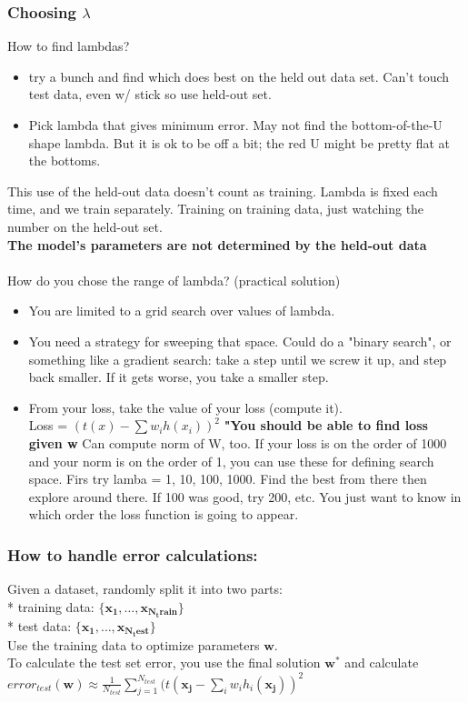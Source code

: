 \subsubsection{Choosing $\lambda$}
How to find lambdas? 
\begin{itemize}
	\item try a bunch and find which does best on the held out data set.  
		Can't touch test data, even w/ stick so use held-out set. 
	\item Pick lambda that gives minimum error.
		May not find the bottom-of-the-U shape lambda.  
		But it is ok to be off a bit; the red U might be pretty flat at the bottoms.
\end{itemize}		
This use of the held-out data doesn't count as training.  
Lambda is fixed each time, and we train separately. 
Training on training data, just watching the number on the held-out set. \hfill \\
\textbf{The model's parameters are not determined by the held-out data} \hfill \\
\hfill \\

How do you chose the range of lambda? (practical solution) 
\begin{itemize}
	\item You are limited to a grid search over values of lambda. 
	\item You need a strategy for sweeping that space.   
		Could do a "binary search", or something like a gradient search: 
		take a step until we screw it up, and step back smaller.   
		If it gets worse, you take a smaller step.
	\item From your loss, take the value of your loss (compute it).  \hfill \\
		Loss = $(t(x) - \sum w_i h(x_i))^2$  
        		\textbf{"You should be able to find loss given w}
            	Can compute norm of W, too.  
		If your loss is on the order of 1000 and your norm is on the order of 1, you can use these for defining search space.
                	Firs try lamba = 1, 10, 100, 1000.  
		Find the best from there then explore around there.
		If 100 was good, try 200, etc.   
		You just want to know in which order the loss function is going to appear. 
\end{itemize}

\subsubsection{How to handle error calculations:}
Given a dataset, randomly split it into two parts:  \hfill \\
* training data: $\{ \bm{x_1}, \dots, \bm{x_{N_train}} \}$   \hfill \\
* test data: $\{ \bm{x_1}, \dots, \bm{x_{N_test}} \}$   \hfill \\
Use the training data to optimize parameters $\bm{w}$. \hfill \\
To calculate the test set error, you use the final solution $\bm{w^*}$ and calculate \hfill \\
$\displaystyle error_{test}(\bm{w}) \approx \frac{1}{N_{test}} \sum_{j=1}^{N_{test}} (t(\bm{x_j} - \sum_i w_i h_i(\bm{x_j}))^2$  \hfill \\

